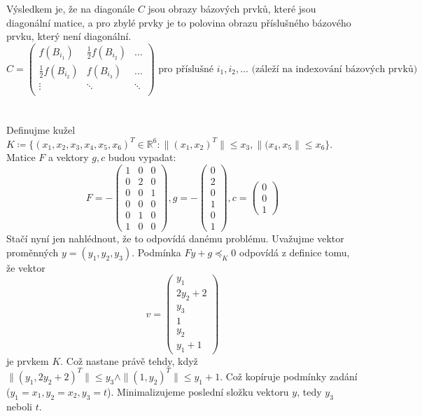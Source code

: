\documentclass[12pt, a4paper]{article}
\begin{document}
Výsledkem je, že na diagonále $C$ jsou obrazy bázových prvků, které jsou diagonální matice, a pro zbylé prvky je to polovina obrazu příslušného bázového prvku, který není diagonální.
\[
C = \begin{pmatrix}
f(B_{i_1}) & \frac{1}{2}f(B_{i_2}) & \dots \\
\frac{1}{2}f(B_{i_2}) & f(B_{i_3}) & \dots \\
\vdots & \ddots & \ddots \\
\end{pmatrix} \text{ pro příslušné $i_1,i_2,\dots$ (záleží na indexování bázových prvků)}
\]

\section{}
Definujme kužel $K \coloneqq \{(x_1,x_2,x_3,x_4,x_5,x_6)^T \in \mathbb{R}^6: \|(x_1,x_2)^T\| \leq x_3, \|(x_4,x_5\| \leq x_6\}$. Matice $F$ a vektory $g, c$ budou vypadat:
\[
F = -\begin{pmatrix}
1 & 0 & 0 \\
0 & 2 & 0 \\
0 & 0 & 1 \\
0 & 0 & 0 \\
0 & 1 & 0 \\
1 & 0 & 0
\end{pmatrix},
g = -\begin{pmatrix}
0 \\
2 \\
0 \\
1 \\
0 \\
1
\end{pmatrix},
c = \begin{pmatrix}
0\\
0\\
1
\end{pmatrix}
\]
Stačí nyní jen nahlédnout, že to odpovídá danému problému. Uvažujme vektor proměnných $y = (y_1, y_2, y_3)$. Podmínka $Fy+g \preceq_K 0$ odpovídá z definice tomu, že vektor
\[
v = \begin{pmatrix}
y_1 \\
2y_2 + 2\\
y_3\\
1\\
y_2\\
y_1+1
\end{pmatrix}
\]
je prvkem $K$. Což nastane právě tehdy, když $\|(y_1,2y_2+2)^T\|\leq y_3 \land \|(1,y_2)^T\| \leq y_1+1$. Což kopíruje podmínky zadání ($y_1 = x_1, y_2 = x_2, y_3 = t$). Minimalizujeme poslední složku vektoru $y$, tedy $y_3$ neboli $t$.
\end{document}
